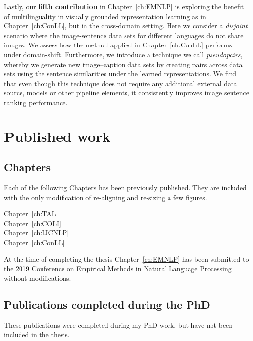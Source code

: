 Lastly, our \textbf{fifth contribution} in Chapter~\ref{ch:EMNLP} is exploring the benefit of multilinguality
in visually grounded representation learning as in Chapter~\ref{ch:ConLL}, but in the cross-domain setting.
Here we consider a \emph{disjoint} scenario where the image-sentence data sets for different languages do
not share images. We assess how the method applied in Chapter~\ref{ch:ConLL} performs under
domain-shift. Furthermore, we introduce a technique we call \emph{pseudopairs}, whereby we generate
new image--caption data sets by creating pairs across data sets using the sentence similarities under
the learned representations. We find that even though this technique does not require any additional
external data source, models or other pipeline elements, 
it consistently improves image sentence ranking performance.


\section{Published work}

\subsection{Chapters}

Each of the following Chapters has been previously published. 
They are included with the only modification of re-aligning and re-sizing a few figures.

\begin{description}
	\item[Chapter~\ref{ch:TAL}] 
	\item[Chapter~\ref{ch:COLI}] 
	\item[Chapter~\ref{ch:IJCNLP}] 
	\item[Chapter~\ref{ch:ConLL}] 
\end{description}

At the time of completing the thesis Chapter~\ref{ch:EMNLP} has been submitted to 
the 2019 Conference on Empirical Methods in Natural Language Processing without modifications.

\subsection{Publications completed during the PhD}
These publications were completed during my PhD work, but have not been included in the thesis.

